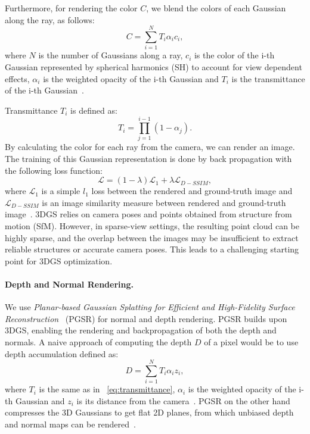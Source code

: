 Furthermore, for rendering the color $C$, we blend the colors of each Gaussian along the ray, as follows:
\begin{equation}
    C = \sum^N_{i=1} T_i \alpha_i c_i,
\end{equation}
where $N$ is the number of Gaussians along a ray, $c_i$ is the color of the i-th Gaussian represented by spherical harmonics (SH) to account for view dependent effects, $\alpha_i$ is the weighted opacity of the i-th Gaussian and $T_i$ is the transmittance of the i-th Gaussian~\cite{3dgs2023}.

Transmittance $T_i$ is defined as:
\begin{equation}
\label{eq:transmittance}
    T_i = \prod^{i-1}_{j=1}(1 - \alpha_j).
\end{equation}%
By calculating the color for each ray from the camera, we can render an image.
The training of this Gaussian representation is done by back propagation with the following loss function:
\begin{equation}
    \mathcal{L} = (1 - \lambda) \mathcal{L}_1 + \lambda \mathcal{L}_{D-SSIM},
\end{equation}
where $\mathcal{L}_1$ is a simple $l_1$ loss between the rendered and ground-truth image and $\mathcal{L}_{D-SSIM}$ is an image similarity measure between rendered and ground-truth image~\cite{3dgs2023, dssim}.
3DGS relies on camera poses and points obtained from structure from motion (SfM). However, in sparse-view settings, the resulting point cloud can be highly sparse, and the overlap between the images may be insufficient to extract reliable structures or accurate camera poses. This leads to a challenging starting point for 3DGS optimization.

\paragraph{Depth and Normal Rendering.}
We use \textit{Planar-based Gaussian Splatting for Efficient
and High-Fidelity Surface Reconstruction}~\cite{pgsr2024} (PGSR) for normal and depth rendering. PGSR builds upon 3DGS, enabling the rendering and backpropagation of both the depth and normals.
A naive approach of computing the depth $D$ of a pixel would be to use depth accumulation defined as:
\begin{equation}
    D = \sum_{i=1}^N T_i \alpha_i z_i,
\end{equation}
where $T_i$ is the same as in ~\cref{eq:transmittance}, $\alpha_i$ is the weighted opacity of the i-th Gaussian and $z_i$ is its distance from the camera~\cite{gaussianproDepth}.
PGSR on the other hand compresses the 3D Gaussians to get flat 2D planes, from which unbiased depth and normal maps can be rendered~\cite{pgsr2024}.

